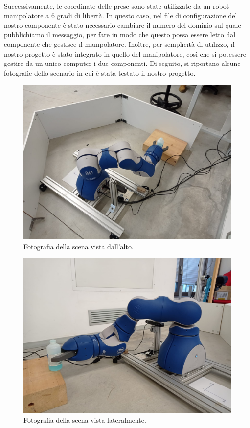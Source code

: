\documentclass{report}
\begin{document}
\\Successivamente, le coordinate delle prese sono state utilizzate da un robot manipolatore a 6 gradi di libertà. In questo caso, nel file di configurazione del nostro componente è stato necessario cambiare il numero del dominio sul quale pubblichiamo il messaggio, per fare in modo che questo possa essere letto dal componente che gestisce il manipolatore. Inoltre, per semplicità di utilizzo, il nostro progetto è stato integrato in quello del manipolatore, così che si potessere gestire da un unico computer i due componenti. Di seguito, si riportano alcune fotografie dello scenario in cui è stata testato il nostro progetto.
\begin{figure}[h!]
	\centering
	\includegraphics[width=\textwidth]{immagini/manipAlto}
	\caption{Fotografia della scena vista dall'alto.}
	\label{figura:manipAlto}
\end{figure}
\begin{figure}[h!]
	\centering
	\includegraphics[width=\textwidth]{immagini/manipDavanti2}
	\caption{Fotografia della scena vista lateralmente.}
	\label{figura:manipDavanti}
\end{figure}
\end{document}
